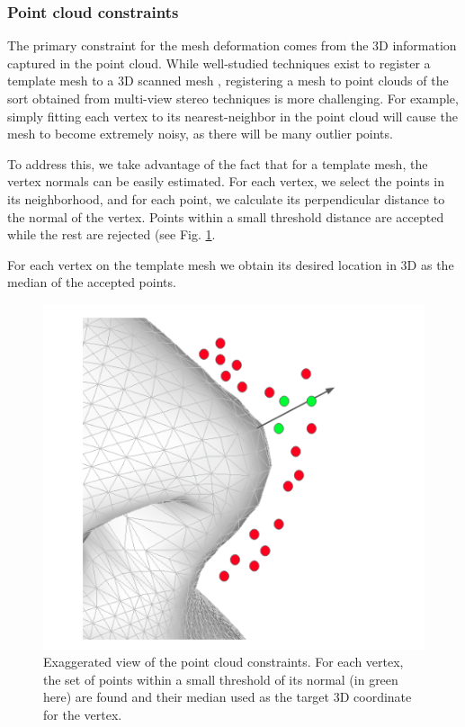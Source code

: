 \documentclass[10pt,twocolumn,letterpaper]{article}
\begin{document}
 
 \subsubsection{Point cloud constraints}
 The primary constraint for the mesh deformation comes from the 3D information captured in the point cloud.
 While well-studied techniques exist to register a template mesh to a 3D scanned mesh \cite{amberg2007optimal}, registering a mesh to point clouds of the sort obtained from multi-view stereo techniques is more challenging. For example, simply fitting each vertex to its nearest-neighbor in the point cloud will cause the mesh to become extremely noisy, as there will be many outlier points.
 
To address this, we take advantage of the fact that for a template mesh, the vertex normals can be easily estimated. For each vertex, we select the points in its neighborhood, and for each point, we calculate its perpendicular distance to the normal of the vertex. Points within a small threshold distance are accepted while the rest are rejected (see Fig. \ref{fig:mesh_fit_pcl}. 
 
 For each vertex on the template mesh we obtain its desired location in 3D as the median of the accepted points. \\
 
\begin{figure}[t]
\begin{center}
   \includegraphics[width=0.8\linewidth]{images/mesh_fit_pcl.png}
\end{center}
   \caption{Exaggerated view of the point cloud constraints. For each vertex, the set of points within a small threshold of its normal (in green here) are found and their median used as the target 3D coordinate for the vertex. }
\label{fig:mesh_fit_pcl}
\end{figure}
\end{document}
